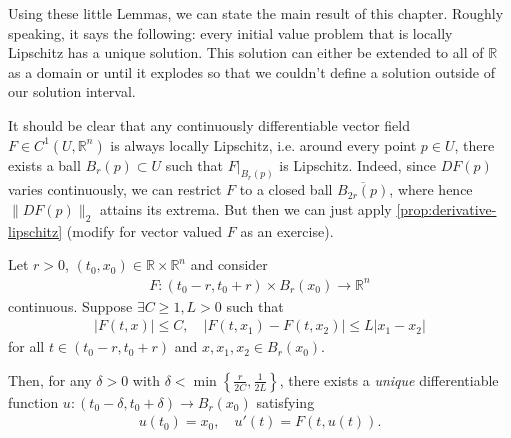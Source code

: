 Using these little Lemmas, we can state the main result of this chapter. Roughly speaking, it says the following: every initial value problem that is locally Lipschitz has a unique solution. This solution can either be extended to all of $\mathbb{R}$ as a domain or until it explodes so that we couldn't define a solution outside of our solution interval.

\begin{remark}
	It should be clear that any continuously differentiable vector field $F \in C^{1}(U, \mathbb{R}^{n})$ is always locally Lipschitz, i.e. around every point $p \in U$, there exists a ball $B_{r}(p) \subset U$ such that $F|_{B_{r}(p)}$ is Lipschitz. Indeed, since $DF(p)$ varies continuously, we can restrict $F$ to a closed ball $\overline{ B_{2r}(p) }$, where hence $\lVert DF(p) \rVert_{2}$ attains its extrema. But then we can just apply \ref{prop:derivative-lipschitz} (modify for vector valued $F$ as an exercise).
\end{remark}
\begin{prop}\label{prop:peano-ex} 
	Let $r > 0$, $(t_{0}, x_{0}) \in \mathbb{R} \times \mathbb{R}^{n}$ and consider
	\begin{align*}
		F: (t_{0} - r, t_{0}+r) \times B_{r}(x_{0}) \to \mathbb{R}^{n}
	\end{align*}
	continuous. Suppose $\exists C \geq 1, L > 0$ such that
	\begin{align*}
		\left| F(t,x)  \right| \leq C, \quad \left| F(t, x_{1}) - F(t, x_{2}) \right| \leq L \left| x_{1}-x_{2} \right|
	\end{align*}
	for all $t \in (t_{0}-r, t_{0}+r)$ and $x, x_{1},x_{2} \in B_{r}(x_{0})$.

	Then, for any $\delta > 0$ with $\delta < \min\left\{ \tfrac{r}{2C}, \tfrac{1}{2L}\right\}$, there exists a \textit{unique} differentiable function $u: (t_{0} - \delta, t_{0} + \delta) \to B_{r}(x_{0})$ satisfying
	\begin{align*}
		u(t_{0}) = x_{0}, \quad u'(t) = F(t,u(t)).
	\end{align*}
\end{prop}
